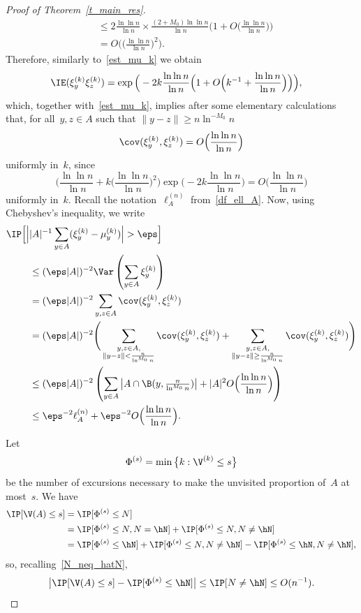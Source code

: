 \begin{proof}[Proof of Theorem~\ref{t_main_res}]
\begin{align*}
&\leq 2\frac{\ln\ln n}{\ln n} \times \frac{(2+M_0)\ln\ln n}{\ln n}
\Big(1+O\Big(\frac{\ln\ln n}{\ln n}\Big)\Big)\\
&= O\Big(\Big(\frac{\ln\ln n}{\ln n}\Big)^2\Big).
\end{align*}
Therefore, similarly to~\eqref{est_mu_k} we obtain
\begin{align*}
\IE(\xi_y^{(k)}\xi_z^{(k)}) &= \exp\Big(-2k\frac{\ln\ln n}{\ln n}
\Big(1+O\Big(k^{-1}+\frac{\ln\ln n}{\ln n}\Big)\Big)\Big),
\end{align*}
which, together with~\eqref{est_mu_k}, implies after some elementary calculations that, for all~$y,z\in A$ such that $\|y-z\|\geq n\ln^{-M_0}n$
\begin{equation}\label{est_cov}
\cov (\xi_y^{(k)},\xi_z^{(k)}) = O\Big(\frac{\ln\ln n}{\ln n}\Big)
\end{equation}
uniformly in~$k$, since
\[
\Bigg(\frac{\ln\ln n}{\ln n} + k\Big(\frac{\ln\ln n}{\ln n}\Big)^2
\Bigg) \exp\Big(-2k\frac{\ln\ln n}{\ln n}\Big) = O\Big(\frac{\ln\ln n}{\ln n}\Big)
\]
uniformly in~$k$. Recall the notation~$\ell^{(n)}_A$ from~\eqref{df_ell_A}. Now, using Chebyshev's inequality, we write
\begin{align}
\IP\Big[\Big|&|A|^{-1}\sum_{y\in A}(\xi_y^{(k)} -\mu_y^{(k)})\Big|>\eps\Big]\nonumber\\
&\leq (\eps|A|)^{-2} \Var \left(\sum_{y\in A}\xi_y^{(k)}\right)
\nonumber\\
&= (\eps|A|)^{-2} \sum_{y,z\in A}\cov (\xi_y^{(k)},\xi_z^{(k)})
\nonumber\\
&= (\eps|A|)^{-2} \Bigg(\sum_{\substack{y,z\in A,\\
\|y-z\|< \frac{n}{\ln^{M_0}n}}} \cov (\xi_y^{(k)},\xi_z^{(k)}) + \sum_{\substack{y,z\in A,\\
\|y-z\|\geq \frac{n}{\ln^{M_0}n}}}
\cov (\xi_y^{(k)},\xi_z^{(k)}) \Bigg)
\nonumber\\
&\leq (\eps|A|)^{-2} \left(\sum_{y\in A} \big|A\cap \B(y,\tfrac{n}{\ln^{M_0}n})\big| + |A|^2 O\Big(\frac{\ln\ln n}{\ln n}\Big) \right)\nonumber\\
&\leq \eps^{-2}
\ell^{(n)}_A + \eps^{-2} O\Big(\frac{\ln\ln n}{\ln n} \Big).\label{bigcalc_Cheb}
\end{align}

Let
\[
\Phi^{(s)} = \min\big\{k: \V^{(k)}\leq s\big\}
\]
be the number of excursions necessary to make the unvisited proportion of~$A$ at most~$s$. We have
\begin{align*}
\IP[\V(A)\leq s] & = \IP[\Phi^{(s)}\leq N]\\
&= \IP[\Phi^{(s)}\leq N,N=\hN] +
\IP[\Phi^{(s)}\leq N,N\neq \hN]\\
&= \IP[\Phi^{(s)}\leq \hN] + \IP[\Phi^{(s)}\leq N,N\neq \hN] - \IP[\Phi^{(s)}\leq \hN,N\neq \hN],
\end{align*}
so, recalling~\eqref{N_neq_hatN},
\begin{equation}\label{V_Phi_hatN}
\big|\IP[\V(A)\leq s] - \IP[\Phi^{(s)}\leq \hN]\big|
\leq \IP[N\neq \hN] \leq O(n^{-1}).
\end{equation}


\end{proof}
